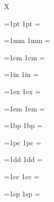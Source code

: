 \documentclass{article}
\begin{document}
X

\def\SHOW#1{%
	\dimen0=#1 %
	#1 = \the{}
}

\SHOW{1pt}

\SHOW{1mm}

\SHOW{1cm}

\SHOW{1in}

\SHOW{1ex}

\SHOW{1em}

\SHOW{1bp}

\SHOW{1pc}

\SHOW{1dd}

\SHOW{1cc}

\SHOW{1sp}

%
\newif\ifcomparewithtex
{}

\newcount\numErrors
\def\parsertest{\pgfutil@ifnextchar[\parsertest@{\parsertest@[]}}%
\def\parsertest@[#1]#2#3#4{%
	\begingroup
	\pgfqkeys{/ut}{#1}%
	\pgfluamathparse{#2}%
	\let\actual=\pgfmathresult
	\ifcomparewithtex
		\ifpgfluamathusedTeXfallback
			\let\expectedTeX=\actual
		\else
			\pgfmathparse{#2}%
			\let\expectedTeX=\pgfmathresult
		\fi
	\else
		\def\expectedTeX{--}%
	\fi
	\edef\expected{#3}%
	\def\success{1}%
	\ifx\expected\empty
		\ifx\actual\empty
		\else
			\def\success{0}%
		\fi
	\else
		\ifx\actual\expected
		\else
			\def\success{0}%
		\fi
	\fi
	\if1\success
	\else
		\message{FAILURE for #2 expected \expected\space but was \actual^^J}%
		\global\advance\numErrors by1
	\fi
	\if1\success
		\if1#4%
			\ifpgfmathunitsdeclared
			\else
				\def\success{0}%
			\fi
		\else
			\ifpgfmathunitsdeclared
				\def\success{0}%
			\fi
		\fi
		\if1\success
		\else
			\message{FAILURE for #2 expected units declared #4 but was \ifpgfmathunitsdeclared true\else false\fi^^J}%
			\global\advance\numErrors by1
		\fi
	\fi
	\if1\success
		\ifcomparewithtex
			\dimen0=\actual pt %
			\dimen1=\expectedTeX pt %
			\advance\dimen0 by-\dimen1
			\ifdim\dimen0<0sp
				\dimen0=-\dimen0
			\fi
			\ifdim\dimen0 > 0.001pt %
				\def\success{0}%
				\message{FAILURE for #2 : matches expectations, but does NOT match TeX output (error \the\dimen0). expected \expectedTeX\space but was \actual^^J}%
				\global\advance\numErrors by1
			\fi
		\fi
	\fi
	\message{#2 = \actual\space (pgf=\expectedTeX) \if1\success OK\else FAILURE\fi^^J}%
	\endgroup
}%
\end{document}
